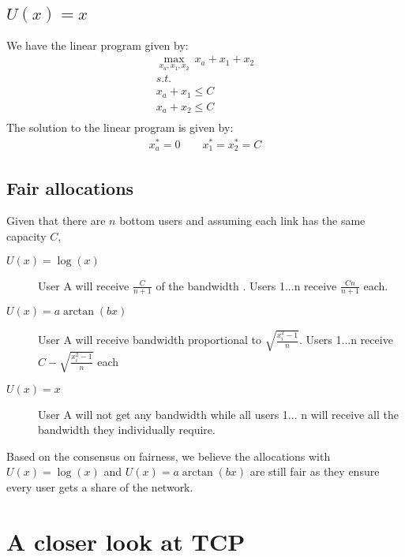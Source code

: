\documentclass[]{article}
\begin{document}
\subsection{$U(x) = x$}

We have the linear program given by:
\begin{gather*}
\underset{x_a, x_1, x_2}{\max}\ x_a + x_1 + x_2 \\
s.t. \\
x_a + x_1 \leq C \\
x_a + x_2 \leq C \\
\end{gather*}
The solution to the linear program is given by:
\begin{gather*}
x_a^* = 0 \qquad x_1^* = x_2^* = C
\end{gather*}

\subsection{Fair allocations}

Given that there are $n$ bottom users and assuming each link has the same capacity $C$,
\begin{description}
\item[$U(x) = \log(x)$] User A will receive $\frac{C}{n + 1}$ of the bandwidth . Users 1...n receive $\frac{Cn}{n+1}$ each.
\item[$U(x) = a \arctan (bx)$] User A will receive bandwidth proportional to $\sqrt{\frac{x_i^2 - 1}{n}}$. Users 1...n receive $C - \sqrt{\frac{x_i^2 - 1}{n}}$ each
\item[$U(x) = x$] User A will not get any bandwidth while all users 1... n will receive all the bandwidth they individually require.
\end{description}

Based on the consensus on fairness, we believe the allocations with $U(x) = \log(x)$ and $U(x) = a \arctan (bx)$ are still fair as they ensure every user gets a share of the network.


\section{A closer look at TCP}
\end{document}
